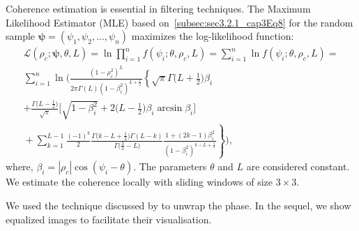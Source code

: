 \documentclass[remotesensing,article,submit,pdftex,moreauthors]{Definitions/mdpi}
\begin{document}
Coherence estimation is essential in filtering techniques. 
The Maximum Likelihood Estimator (MLE) based on~\eqref{subsec:sec3.2.1_cap3Eq8} 
for the random sample  
$\bm{\psi} = (\psi_1, \psi_2, \dots, \psi_n)$ maximizes the log-likelihood function:
\begin{multline}
\mathcal{L}(\rho_c; \bm{\psi}, \theta, L) = \ln \prod_{i=1}^{n} f(\psi_i; \theta, \rho_c, L) = \sum_{i=1}^{n} \ln f(\psi_i; \theta, \rho_c, L) = \\ 
\sum_{i=1}^{n}\ln\Bigg(\frac{(1-\rho_c^2)^L}{2\pi\Gamma(L)(1-\beta_i^2)^{L+\frac{1}{2}}}\left\lbrace \sqrt{\pi}\Gamma\Big(L+\frac{1}{2}\Big)\beta_i\right.\\
	+\frac{\Gamma\big(L-\frac{1}{2}\big) }{\sqrt{\pi}}\bigg[ \sqrt{1-\beta_i^2}+2\Big(L-\frac{1}{2}\Big)\beta_i\arcsin\beta_i\bigg]\\ 
	\mbox{}+\sum_{k=1}^{L-1}\frac{(-1)^k}{2}\frac{\Gamma\big( k-L+\frac{1}{2}\big) \Gamma(L-k)}{\Gamma\big( \frac{3}{2}-L\big) }
	\left.\frac{1+(2k-1)\beta_i^2}{(1-\beta_i^2)^{k-L+\frac{1}{2}}}\right\rbrace\Bigg),
\label{eq:LogLikelihood}
\end{multline}
where, $\beta_i=|\rho_c|\cos(\psi_i-\theta)$.
The parameters $\theta$ and $L$ are considered constant. 
We estimate the coherence locally 
with sliding windows of size 
$3 \times 3$. 

%
%
%

We used the technique 
discussed by \citet{DomnguezGuzmn2009}
to unwrap the phase. 
In the sequel, we show equalized images to facilitate their visualisation.
 
\end{document}
